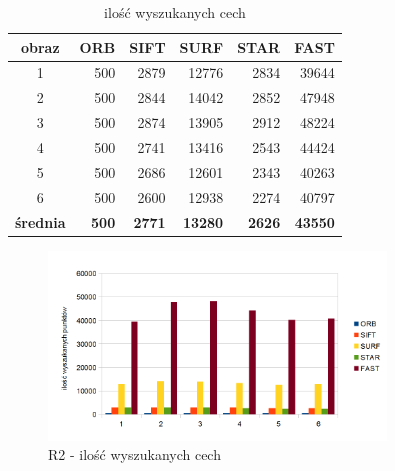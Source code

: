 \begin{table}[htbp]
  \centering
  \caption{ilość wyszukanych cech}
    \begin{tabular}{|c|r|r|r|r|r|}\hline
    
    obraz & \textbf{ORB} & \textbf{SIFT} & \textbf{SURF} & \textbf{STAR} & \textbf{FAST} \\\hline
    
   
    1 & 500 & 2879 & 12776 & 2834 & 39644 \\
    2 & 500 & 2844 & 14042 & 2852 & 47948 \\
    3 & 500 & 2874 & 13905 & 2912 & 48224 \\
    4 & 500 & 2741 & 13416 & 2543 & 44424 \\
    5 & 500 & 2686 & 12601 & 2343 & 40263 \\
    6 & 500 & 2600 & 12938 & 2274 & 40797 \\\hline
    \textbf{średnia} & \textbf{500} & \textbf{2771} & \textbf{13280} & \textbf{2626} & \textbf{43550} \\
    \hline
    \end{tabular}%
  \label{tab:r2_f1}%
\end{table}%


\begin{figure}
\centering
\includegraphics[width=0.8\textwidth]{pict/slowik/r2/f1.png}
\caption{R2 - ilość wyszukanych cech}
\label{fig:r2_f1}
\end{figure}


